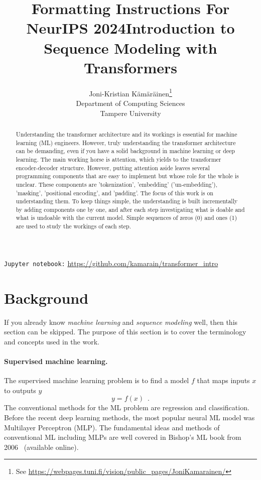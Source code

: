 \documentclass[final]{article}
\title{Formatting Instructions For NeurIPS 2024}
\title{Introduction to Sequence Modeling with Transformers}
\author{%
  Joni-Kristian K{\"a}m{\"a}r{\"a}inen\thanks{See \url{https://webpages.tuni.fi/vision/public_pages/JoniKamarainen/}}\\
  Department of Computing Sciences\\
  Tampere University
}
\begin{document}
\maketitle


\begin{abstract}
  Understanding the transformer architecture and its workings is
  essential for machine learning (ML) engineers. However, truly
  understanding the transformer architecture can be demanding, even if
  you have a solid background in machine learning or deep
  learning. The main working horse is attention, which yields to the
  transformer encoder-decoder structure. However, putting attention
  aside leaves several programming components that are easy to
  implement but whose role for the whole is unclear. These components
  are 'tokenization', 'embedding' ('un-embedding'), 'masking', 'positional encoding', and 'padding'. The focus of this work is on understanding
  them. To keep things simple, the understanding is built
  incrementally by adding components one by one, and after each step
  investigating what is doable and what is undoable with the current
  model. Simple sequences of zeros (0) and ones (1) are used to study
  the workings of each step.
\end{abstract}

\begin{center}
\texttt{Jupyter notebook:} \url{https://github.com/kamarain/transformer_intro}
\end{center}

\section{Background}
If you already know \textit{machine learning} and
\textit{sequence modeling} well, then this section can be skipped. The
purpose of this section is to 
cover the terminology and concepts used in the work.

\paragraph{Supervised machine learning.}
The supervised machine learning problem is to find a model $f$ that
maps inputs $x$ to outputs $y$
\begin{equation}
  y = f(x) \enspace .
  \label{eq:supervisedML}
\end{equation}
The conventional methods for the ML problem are regression and classification.
Before the recent deep learning methods,
the most popular neural ML model was Multilayer Perceptron (MLP). The
fundamental ideas and methods of conventional ML including MLPs are
well covered in Bishop's ML book from 2006~\cite{MLBook}
(available online).
\end{document}
